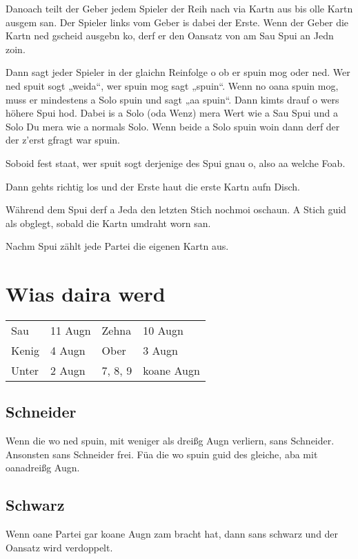 \documentclass[11pt,a4paper]{scrartcl}		%
\begin{document}
	Danoach teilt der Geber jedem Spieler der Reih nach via Kartn aus bis olle Kartn ausgem san. Der Spieler links vom Geber is dabei der Erste. Wenn der Geber die Kartn ned gscheid ausgebn ko, derf er den Oansatz von am Sau Spui an Jedn zoin.	

	Dann sagt jeder Spieler in der glaichn Reinfolge o ob er spuin mog oder ned. Wer ned spuit sogt „weida“, wer spuin mog sagt „spuin“. Wenn no oana spuin mog, muss er mindestens a Solo spuin und sagt „aa spuin“. Dann kimts drauf o wers höhere Spui hod. Dabei is a Solo (oda Wenz) mera Wert wie a Sau Spui und a Solo Du mera wie a normals Solo. Wenn beide a Solo spuin woin dann derf der der z'erst gfragt war spuin.  

	Soboid fest staat, wer spuit sogt derjenige des Spui gnau o, also aa welche Foab.

	Dann gehts richtig los und der Erste haut die erste Kartn aufn Disch.

	Während dem Spui derf a Jeda den letzten Stich nochmoi oschaun.
	A Stich guid als obglegt, sobald die Kartn umdraht worn san.

	Nachm Spui zählt jede Partei die eigenen Kartn aus.




	\section{Wias daira werd}

	\begin{tabular}{ll|ll}
		Sau & 11 Augn & Zehna & 10 Augn\\
		Kenig & 4 Augn &  Ober & 3 Augn\\
		Unter & 2 Augn & 7, 8, 9 & koane Augn
	\end{tabular}

	


		\subsection{Schneider}
		Wenn die wo ned spuin, mit weniger als dreißg Augn verliern, sans Schneider. Ansonsten sans Schneider frei.
		Füa die wo spuin guid des gleiche, aba mit oanadreißg Augn.





		\subsection{Schwarz}
		Wenn oane Partei gar koane Augn zam bracht hat, dann sans schwarz und der Oansatz wird verdoppelt.
\end{document}
